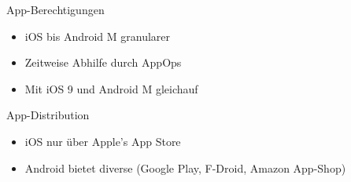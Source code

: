 \begin{frame}

	\begin{block}{}
		App-Berechtigungen
	\end{block}
	\begin{itemize}
	  \item iOS bis Android M granularer
	  \item Zeitweise Abhilfe durch AppOps
	  \item Mit iOS 9 und Android M gleichauf
	\end{itemize}
	
	\begin{block}{}
		App-Distribution
	\end{block}
	\begin{itemize}
	  \item iOS nur über Apple's App Store
	  \item Android bietet diverse (Google Play, F-Droid, Amazon App-Shop)
	\end{itemize}

\end{frame}